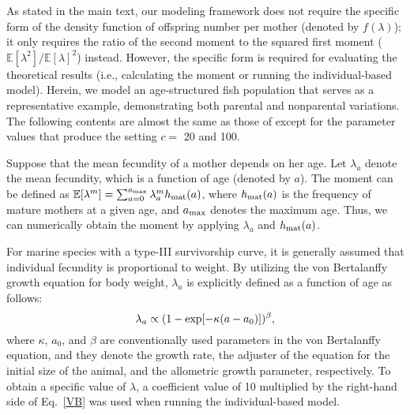 \documentclass[12pt, English]{article}
\begin{document}
\begin{spacing}{1.9}
As stated in the main text, our modeling framework does not require the specific form of the density function of offspring number per mother (denoted by $f(\lambda)$); it only requires the ratio of the second moment to the squared first moment ($\mathbb{E}[\lambda^2] / \mathbb{E}[\lambda]^2$) instead. However, the specific form is required for evaluating the theoretical results (i.e., calculating the moment or running the individual-based model). Herein, we model an age-structured fish population that serves as a representative example, demonstrating both parental and nonparental variations. The following contents are almost the same as those of \cite{Akita_2019} except for the parameter values that produce the setting $c=$ 20 and 100.

Suppose that the mean fecundity of a mother depends on her age. Let $\lambda_a$ denote the mean fecundity, which is a function of age (denoted by $a$). The moment can be defined as $\mathbb{E}[\lambda^m] = \sum_{a=0}^{a_{\rm max}} \lambda_a^m h_{\rm mat}(a)$, where $h_{\rm mat}(a)$ is the frequency of mature mothers at a given age, and $a_{\rm max}$ denotes the maximum age. Thus, we can numerically obtain the moment by applying $\lambda_a$ and $h_{\rm mat}(a)$. 

For marine species with a type-III survivorship curve, it is generally assumed that individual fecundity is proportional to weight. By utilizing the von Bertalanffy growth equation for body weight, $\lambda_a$ is explicitly defined as a function of age as follows:  
\begin{equation}
\lambda_a \propto ( 1-{\rm exp}[-\kappa(a-a_0)])^{\beta}, 
\label{VB}
\end{equation}
where $\kappa$, $a_0$, and $\beta$ are conventionally used parameters in the von Bertalanffy equation, and they denote the growth rate, the adjuster of the equation for the initial size of the animal, and the allometric growth parameter, respectively. To obtain a specific value of $\lambda$, a coefficient value of 10 multiplied by the right-hand side of Eq.~\ref{VB} was used when running the individual-based model. 


\end{spacing}
\end{document}
